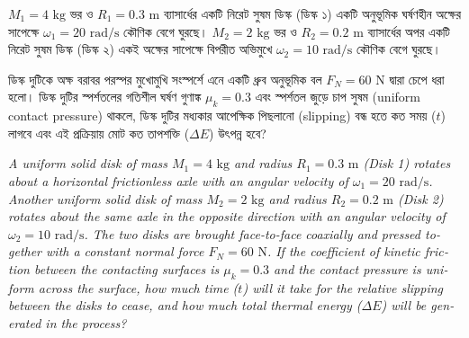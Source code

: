 \documentclass[12pt, a4paper]{article}
\begin{document}
\begin{tcolorbox}[questionbox={প্রশ্ন (Question) 9}]
\noindent
$M_1 = 4\text{ kg}$ ভর ও $R_1 = 0.3\text{ m}$ ব্যাসার্ধের একটি নিরেট সুষম ডিস্ক (ডিস্ক ১) একটি অনুভূমিক ঘর্ষণহীন অক্ষের সাপেক্ষে $\omega_1 = 20\text{ rad/s}$ কৌণিক বেগে ঘুরছে। $M_2 = 2\text{ kg}$ ভর ও $R_2 = 0.2\text{ m}$ ব্যাসার্ধের অপর একটি নিরেট সুষম ডিস্ক (ডিস্ক ২) একই অক্ষের সাপেক্ষে বিপরীত অভিমুখে $\omega_2 = 10\text{ rad/s}$ কৌণিক বেগে ঘুরছে। 

\vspace{0.3em}
\noindent
ডিস্ক দুটিকে অক্ষ বরাবর পরস্পর মুখোমুখি সংস্পর্শে এনে একটি ধ্রুব অনুভূমিক বল $F_N = 60\text{ N}$ দ্বারা চেপে ধরা হলো। ডিস্ক দুটির স্পর্শতলের গতিশীল ঘর্ষণ গুণাঙ্ক $\mu_k = 0.3$ এবং স্পর্শতল জুড়ে চাপ সুষম (uniform contact pressure) থাকলে, ডিস্ক দুটির মধ্যকার আপেক্ষিক পিছলানো (slipping) বন্ধ হতে কত সময় ($t$) লাগবে এবং এই প্রক্রিয়ায় মোট কত তাপশক্তি ($\Delta E$) উৎপন্ন হবে?

\vspace{0.8em}
\begin{english}
\noindent\textit{\color{darkgray}
A uniform solid disk of mass $M_1 = 4\text{ kg}$ and radius $R_1 = 0.3\text{ m}$ (Disk 1) rotates about a horizontal frictionless axle with an angular velocity of $\omega_1 = 20\text{ rad/s}$. Another uniform solid disk of mass $M_2 = 2\text{ kg}$ and radius $R_2 = 0.2\text{ m}$ (Disk 2) rotates about the same axle in the opposite direction with an angular velocity of $\omega_2 = 10\text{ rad/s}$. The two disks are brought face-to-face coaxially and pressed together with a constant normal force $F_N = 60\text{ N}$. If the coefficient of kinetic friction between the contacting surfaces is $\mu_k = 0.3$ and the contact pressure is uniform across the surface, how much time ($t$) will it take for the relative slipping between the disks to cease, and how much total thermal energy ($\Delta E$) will be generated in the process?
}
\end{english}
\end{tcolorbox}
\end{document}
